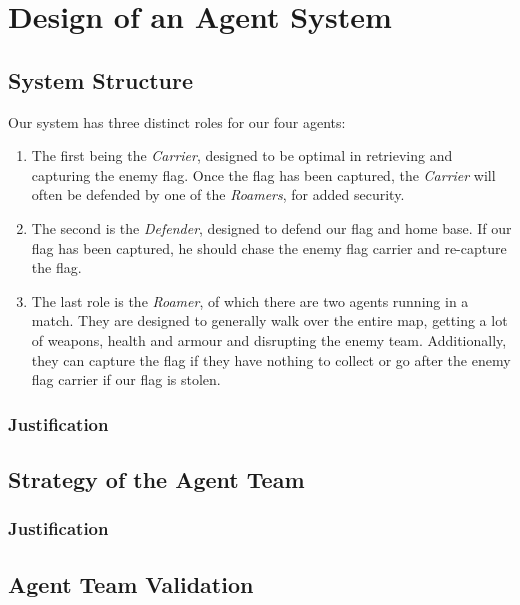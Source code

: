 \chapter{Design of an Agent System}
\section{System Structure}
Our system has three distinct roles for our four agents:

\begin{enumerate}
\item The first being the \emph{Carrier}, designed to be optimal in retrieving and capturing the enemy flag. Once the flag has been captured, the \emph{Carrier} will often be defended by one of the \emph{Roamers}, for added security.
\item The second is the \emph{Defender}, designed to defend our flag and home base. If our flag has been captured, he should chase the enemy flag carrier and re-capture the flag.
\item The last role is the \emph{Roamer}, of which there are two agents running in a match. They are designed to generally walk over the entire map, getting a lot of weapons, health and armour and disrupting the enemy team. Additionally, they can capture the flag if they have nothing to collect or go after the enemy flag carrier if our flag is stolen.
\end{enumerate}

\subsection{Justification}

\section{Strategy of the Agent Team}

\subsection{Justification}

\section{Agent Team Validation}